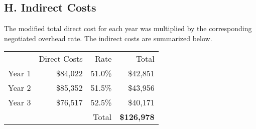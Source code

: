 \documentclass[nsfbudgjust]{nsfproposal}
\begin{document}
\subsection*{H. Indirect Costs}

\noindent The modified total direct cost for each year was multiplied by the corresponding negotiated overhead rate. The indirect costs are summarized below.
\newline
\newline
\begin{table}[H]
\begin{tabular}[c]{r r r | r}
        & Direct Costs  & Rate      & Total\\
Year 1  & \$84,022      & 51.0\%    & \$42,851\\
Year 2  & \$85,352      & 51.5\%    & \$43,956\\
Year 3  & \$76,517      & 52.5\%    & \$40,171\\
\hline
        &               & Total     & \textbf{\$126,978}
\end{tabular}
\end{table}
\end{document}
